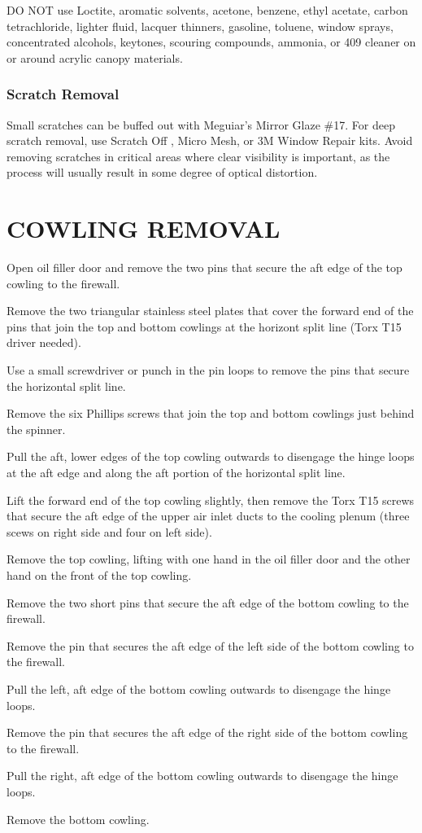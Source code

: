 \begin{Note}[CAUTION]DO NOT use Loctite, aromatic solvents, acetone, benzene, ethyl acetate, carbon tetrachloride, lighter fluid, lacquer thinners, gasoline, toluene, window sprays, concentrated alcohols, keytones, scouring compounds, ammonia, or 409 cleaner on or around acrylic canopy materials.
\end{Note}

\subsubsection{Scratch Removal}
Small scratches can be buffed out with Meguiar's Mirror Glaze \#17. For deep scratch removal, use Scratch Off , Micro Mesh, or 3M Window Repair kits. Avoid removing scratches in critical areas where clear visibility is important, as the process will usually result in some degree of optical distortion.

\section{COWLING REMOVAL} 
\begin{enumerate*}
  \item Open oil filler door and remove the two pins that secure the aft edge of the top cowling to the firewall.
  \item Remove the two triangular stainless steel plates that cover the forward end of the pins that join the top and bottom cowlings at the horizont split line (Torx T15 driver needed).
  \item Use a small screwdriver or punch in the pin loops to remove the pins that secure the horizontal split line.
  \item Remove the six Phillips screws that join the top and bottom cowlings just behind the spinner.
  \item Pull the aft, lower edges of the top cowling outwards to disengage the hinge loops at the aft edge and along the aft portion of the horizontal split line.
  \item Lift the forward end of the top cowling slightly, then remove the Torx T15 screws that secure the aft edge of the upper air inlet ducts to the cooling plenum (three scews on right side and four on left side).
  \item Remove the top cowling, lifting with one hand in the oil filler door and the other hand on the front of the top cowling.
  \item Remove the two short pins that secure the aft edge of the bottom cowling to the firewall.
  \item Remove the pin that secures the aft edge of the left side of the bottom cowling to the firewall.
  \item Pull the left, aft edge of the bottom cowling outwards to disengage the hinge loops.
  \item Remove the pin that secures the aft edge of the right side of the bottom cowling to the firewall.
  \item Pull the right, aft edge of the bottom cowling outwards to disengage the hinge loops.
  \item Remove the bottom cowling.
  \end{enumerate*}


